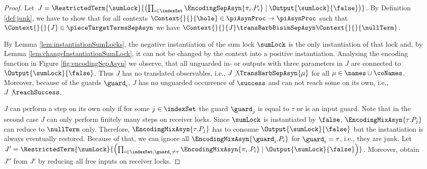 \documentclass[]{llncs}
\begin{document}
\begin{proof}
	Let $ J = \RestrictedTerm{\sumLock}{\left( \prod_{i \in \indexSet} \EncodingSepAsyn{\pi_i.P_i} \mid \Output{\sumLock}{\false} \right)} $. By Definition \ref{def:junk}, we have to show that for all contexts $ \Context{}{}{\hole} \in \piAsynProc \to \piAsynProc $ such that $ \Context{}{}{J} \in \pieceTargetTermsSepAsyn $ we have $ \Context{}{}{J} \transBarbBisimSepAsyn \Context{}{}{\nullTerm} $.
	
	By Lemma \ref{lem:instantiationSumLocks}, the negative instantiation of the sum lock $ \sumLock $ is the only instantiation of that lock and, by Lemma \ref{lem:changeInstantiationSumLock}, it can not be changed by the context into a positive instantiation. Analysing the encoding function in Figure \ref{fig:encodingSepAsyn} we observe, that all unguarded in- or outputs with three parameters in $ J $ are connected to $ \Output{\sumLock}{\false} $. Thus $ J $ has no translated observables, i.e., $ J\not\TransBarbSepAsyn{\mu} $ for all $ \mu \in \names \cup \coNames $. Moreover, because of the guards $ \guard_i $, $ J $ has no unguarded occurrence of $ \success $ and can not reach some on its own, i.e., $ J\not\reachSuccess $.
	
	$ J $ can perform a step on its own only if for some $ j \in \indexSet $ the guard $ \guard_j $ is equal to $ \tau $ or is an input guard. Note that in the second case $ J $ can only perform finitely many steps on receiver locks. Since $ \sumLock $ is instantiated by $ \false $, $ \EncodingMixAsyn{\tau.P_j} $ can reduce to $ \nullTerm $ only. Therefore, $ \EncodingMixAsyn{\tau.P_j} $ has to consume $ \Output{\sumLock}{\false} $ but the instantiation is always eventually restored. Because of that, we can ignore all $ \EncodingMixAsyn{\guard_i.P_i} $ for $ \guard_i = \tau $, i.e., they are junk. Let $ J' = \RestrictedTerm{\sumLock}{\left( \prod_{i \in \indexSet, \guard_i \neq \tau} \EncodingMixAsyn{\pi_i.P_i} \mid \Output{\sumLock}{\false} \right)} $. Moreover, obtain $ J'' $ from $ J' $ by reducing all free inputs on receiver locks.
	

\end{proof}
\end{document}
